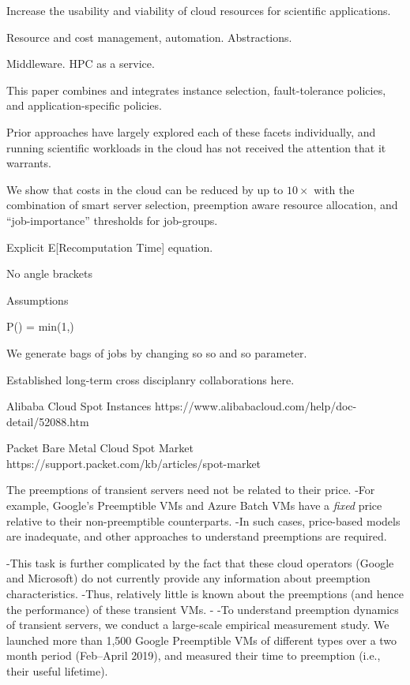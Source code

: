 Increase the usability and viability of cloud resources for scientific applications.

Resource and cost management, automation. Abstractions. 

Middleware. HPC as a service.


This paper combines and integrates instance selection, fault-tolerance policies, and application-specific policies.

Prior approaches have largely explored each of these facets individually, and running scientific workloads in the cloud has not received the attention that it warrants.

We show that costs in the cloud can be reduced by up to $10\times$ with the combination of smart server selection, preemption aware resource allocation, and ``job-importance'' thresholds for job-groups.

Explicit E[Recomputation Time] equation. 


No angle brackets

Assumptions

P() = min(1,)

We generate bags of jobs by changing so so and so parameter.

Established long-term cross disciplanry collaborations here. 

Alibaba Cloud Spot Instances 
https://www.alibabacloud.com/help/doc-detail/52088.htm

Packet Bare Metal Cloud Spot Market
https://support.packet.com/kb/articles/spot-market

The preemptions of transient servers need not be related to their price.
-For example, Google's Preemptible VMs and Azure Batch VMs have a \emph{fixed} price relative to their non-preemptible counterparts. 
-In such cases, price-based models are inadequate, and other approaches to understand preemptions are required.
 
-This task is further complicated by the fact that these cloud operators (Google and Microsoft) do not currently provide any information about preemption characteristics. 
-Thus, relatively little is known about the preemptions (and hence the performance) of these transient VMs. %
-%
-To understand preemption dynamics of transient servers, we conduct a large-scale empirical measurement study. 
 We launched more than 1,500 Google Preemptible VMs of different types over a two month period (Feb--April 2019), and measured their time to preemption (i.e., their useful lifetime).\footnotemark
 
